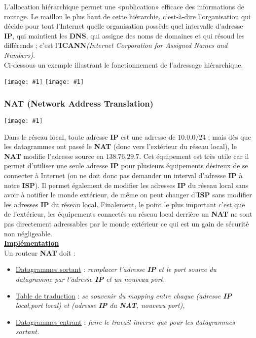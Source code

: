 \documentclass{article}
\newcommand{\ora}[1]{\textcolor{darko}{#1}}
\newcommand{\imageR}[2]{\texttt{[image: \#1]}}
\newcommand{\point}[2]{\item \ora{\underline{#1}} : \textit{#2}}
\begin{document}
L'allocation hiérarchique permet une «publication» efficace des informations de routage. Le maillon le plus haut
de cette hiérarchie, c'est-à-dire l'organisation qui décide pour tout l'Internet quelle organisation possède 
quel intervalle d'adresse \textbf{IP}, qui maintient les \textbf{DNS}, qui assigne des noms de domaines et qui 
résoud les différends ; c'est l'\textbf{ICANN}\textit{(Internet Corporation for Assigned Names and Numbers)}. \\
Ci-dessous un exemple illustrant le fonctionnement de l'adressage hiérarchique.

\imageR{CN_080.png}{200} \imageR{CN_081.png}{250}

\subsubsection{NAT (Network Address Translation)}

\imageR{CN_082.png}{300}

Dans le réseau local, toute adresse \textbf{IP} est une adresse de $10.0.0/24$ ; mais dès que les datagrammes ont 
passé le \textbf{NAT} (donc vers l'extérieur du réseau local), le \textbf{NAT} modifie l'adresse source en 
$138.76.29.7$. Cet équipement est très utile car il permet d'utiliser une seule adresse \textbf{IP} pour 
plusieurs équipements désireux de se connecter à Internet (on ne doit donc pas demander un interval d'adresse 
\textbf{IP} à notre \textbf{ISP}). Il permet également de modifier les adresses \textbf{IP} du réseau local sans
avoir à notifier le monde extérieur, de même on peut changer d'\textbf{ISP} sans modifier les adresses 
\textbf{IP} du réseau local. Finalement, le point le plus important c'est que de l'extérieur, les équipements
connectés au réseau local derrière un \textbf{NAT} ne sont pas directement adressables par le monde extérieur 
ce qui est un gain de sécurité non négligeable.\\

\textbf{\underline{Implémentation}}\\

Un routeur \textbf{NAT} doit :
\begin{itemize}
\point{Datagrammes sortant}{remplacer l'adresse \textbf{IP} et le port source du datagramme par l'adresse 
\textbf{IP} et un nouveau port,}
\point{Table de traduction}{se souvenir du mapping entre chaque (adresse \textbf{IP} local,port local) et 
(adresse \textbf{IP} du \textbf{NAT}, nouveau port),}
\point{Datagrammes entrant}{faire le travail inverse que pour les datagrammes sortant.}
\end{itemize}
\end{document}
